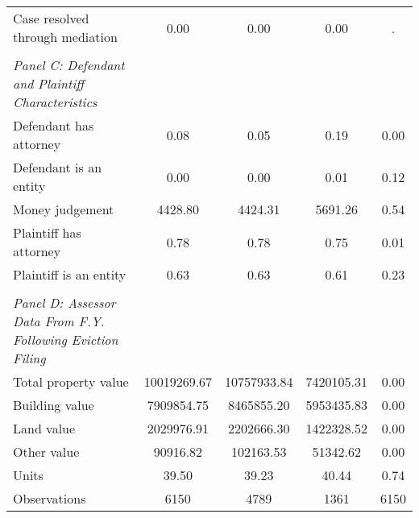 {\begin{tabular}{l*{4}{c}}
\hspace{0.25cm}Case resolved through mediation&       0.00 &       0.00 &       0.00 &           .\\
\vspace{0.1em} \\ \emph{Panel C: Defendant and Plaintiff Characteristics}&            &            &            &            \\
\hspace{0.25cm}Defendant has attorney&       0.08 &       0.05 &       0.19 &        0.00\\
\hspace{0.25cm}Defendant is an entity&       0.00 &       0.00 &       0.01 &        0.12\\
\hspace{0.25cm}Money judgement&    4428.80 &    4424.31 &    5691.26 &        0.54\\
\hspace{0.25cm}Plaintiff has attorney&       0.78 &       0.78 &       0.75 &        0.01\\
\hspace{0.25cm}Plaintiff is an entity&       0.63 &       0.63 &       0.61 &        0.23\\
\vspace{0.1em} \\ \emph{Panel D: Assessor Data From F.Y. Following Eviction Filing}&            &            &            &            \\
\hspace{0.25cm}Total property value&10019269.67 &10757933.84 & 7420105.31 &        0.00\\
\hspace{0.25cm}Building value& 7909854.75 & 8465855.20 & 5953435.83 &        0.00\\
\hspace{0.25cm}Land value& 2029976.91 & 2202666.30 & 1422328.52 &        0.00\\
\hspace{0.25cm}Other value&   90916.82 &  102163.53 &   51342.62 &        0.00\\
\hspace{0.25cm}Units&      39.50 &      39.23 &      40.44 &        0.74\\
\midrule
Observations        &        6150&        4789&        1361&        6150\\
\bottomrule
\end{tabular}
}
